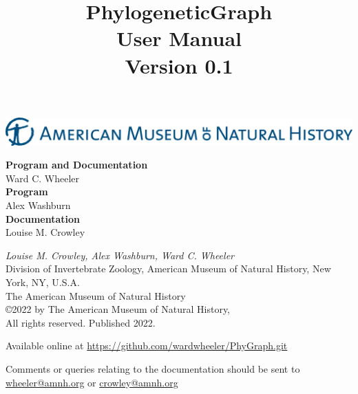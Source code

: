 \documentclass[11pt]{book}
\begin{document}
	
	\title{PhylogeneticGraph\\User Manual\\Version 0.1}
	
	\maketitle
	
	\newpage

	 \begin{center}
		\includegraphics[width=\textwidth]{AMNHLogo.jpg}
	\end{center}

	\vspace*{5.50cm}	
	\begin{flushleft}
		\textbf {Program and Documentation} \\ Ward C. Wheeler \\
		\vspace*{0.50cm}
		\textbf {Program} \\ Alex Washburn  \\
		\vspace*{0.50cm}
		\textbf{Documentation} \\ Louise M. Crowley
	\end{flushleft}
	

	\vspace*{5.50cm}
	
	\begin{flushleft}
		\small
		{\it Louise M. Crowley, Alex Washburn,  Ward C. Wheeler} \\
		
		Division of Invertebrate Zoology, American Museum of Natural History, New York, NY, U.S.A.\\
		\smallskip
		The American Museum of Natural History\\
		\copyright  2022 by The American Museum of Natural History, \\
		All rights reserved. Published 2022.
		
		\vspace*{0.25cm}
		
		Available online at \url{https://github.com/wardwheeler/PhyGraph.git} 
		
		Comments or queries relating to the documentation should be sent to \href{mailto:wheeler@amnh.org}
		{wheeler@amnh.org} or \href{mailto:crowley@amnh.org}{crowley@amnh.org}
	\end{flushleft}
	
\end{document}
